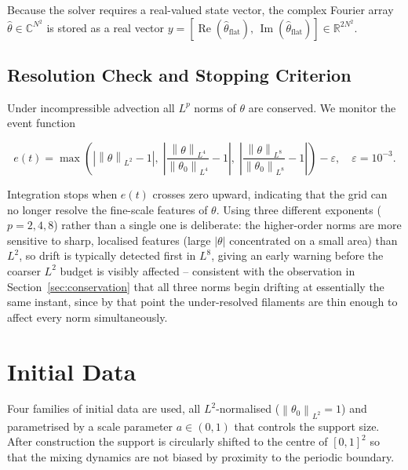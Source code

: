 \documentclass[12pt,a4paper]{article}
\newcommand{\norm}[1]{\left\lVert#1\right\rVert}
\theoremstyle{definition}
\theoremstyle{plain}
\begin{document}
Because the solver requires a real-valued state vector, the complex
Fourier array $\hat\theta\in\mathbb{C}^{N^2}$ is stored as a real vector
$y = [\operatorname{Re}(\hat\theta_{\text{flat}}),\,
       \operatorname{Im}(\hat\theta_{\text{flat}})]\in\mathbb{R}^{2N^2}$.

\subsection{Resolution Check and Stopping Criterion}
\label{sec:rescheck}

Under incompressible advection all $L^p$ norms of $\theta$ are conserved.
We monitor the event function

\begin{equation}
  e(t) = \max\!\left(
    |\norm{\theta}_{L^2}-1|,\;
    \left|\frac{\norm{\theta}_{L^4}}{\norm{\theta_0}_{L^4}}-1\right|,\;
    \left|\frac{\norm{\theta}_{L^8}}{\norm{\theta_0}_{L^8}}-1\right|
  \right) - \varepsilon,
  \quad \varepsilon = 10^{-3}.
\end{equation}

Integration stops when $e(t)$ crosses zero upward, indicating that the
grid can no longer resolve the fine-scale features of $\theta$. Using three
different exponents ($p=2,4,8$) rather than a single one is deliberate: the
higher-order norms are more sensitive to sharp, localised features (large
$|\theta|$ concentrated on a small area) than $L^2$, so drift is typically
detected first in $L^8$, giving an early warning before the coarser $L^2$
budget is visibly affected -- consistent with the observation in
Section~\ref{sec:conservation} that all three norms begin drifting at
essentially the same instant, since by that point the under-resolved
filaments are thin enough to affect every norm simultaneously.

\section{Initial Data}
\label{sec:idata}

Four families of initial data are used, all $L^2$-normalised
($\norm{\theta_0}_{L^2}=1$) and parametrised by a scale parameter
$a\in(0,1)$ that controls the support size.
After construction the support is circularly shifted to the centre of $[0,1]^2$
so that the mixing dynamics are not biased by proximity to the periodic
boundary.
\end{document}
